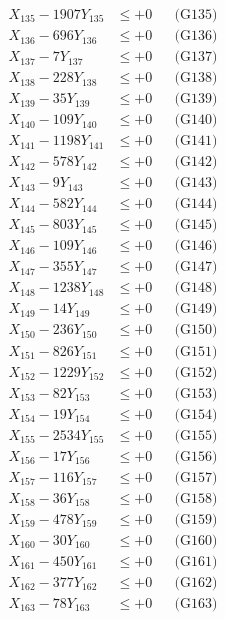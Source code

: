 \documentclass[a4paper,10pt]{article}
\begin{document}
{\begin{align}
X_{135} - 1907Y_{135} &\leq +0 && \text{(G135)} \\
X_{136} - 696Y_{136} &\leq +0 && \text{(G136)} \\
X_{137} - 7Y_{137} &\leq +0 && \text{(G137)} \\
X_{138} - 228Y_{138} &\leq +0 && \text{(G138)} \\
X_{139} - 35Y_{139} &\leq +0 && \text{(G139)} \\
X_{140} - 109Y_{140} &\leq +0 && \text{(G140)} \\
\allowbreak
X_{141} - 1198Y_{141} &\leq +0 && \text{(G141)} \\
X_{142} - 578Y_{142} &\leq +0 && \text{(G142)} \\
X_{143} - 9Y_{143} &\leq +0 && \text{(G143)} \\
X_{144} - 582Y_{144} &\leq +0 && \text{(G144)} \\
X_{145} - 803Y_{145} &\leq +0 && \text{(G145)} \\
X_{146} - 109Y_{146} &\leq +0 && \text{(G146)} \\
X_{147} - 355Y_{147} &\leq +0 && \text{(G147)} \\
X_{148} - 1238Y_{148} &\leq +0 && \text{(G148)} \\
X_{149} - 14Y_{149} &\leq +0 && \text{(G149)} \\
X_{150} - 236Y_{150} &\leq +0 && \text{(G150)} \\
\allowbreak
X_{151} - 826Y_{151} &\leq +0 && \text{(G151)} \\
X_{152} - 1229Y_{152} &\leq +0 && \text{(G152)} \\
X_{153} - 82Y_{153} &\leq +0 && \text{(G153)} \\
X_{154} - 19Y_{154} &\leq +0 && \text{(G154)} \\
X_{155} - 2534Y_{155} &\leq +0 && \text{(G155)} \\
X_{156} - 17Y_{156} &\leq +0 && \text{(G156)} \\
X_{157} - 116Y_{157} &\leq +0 && \text{(G157)} \\
X_{158} - 36Y_{158} &\leq +0 && \text{(G158)} \\
X_{159} - 478Y_{159} &\leq +0 && \text{(G159)} \\
X_{160} - 30Y_{160} &\leq +0 && \text{(G160)} \\
\allowbreak
X_{161} - 450Y_{161} &\leq +0 && \text{(G161)} \\
X_{162} - 377Y_{162} &\leq +0 && \text{(G162)} \\
X_{163} - 78Y_{163} &\leq +0 && \text{(G163)} \\

\end{align}}
\end{document}
